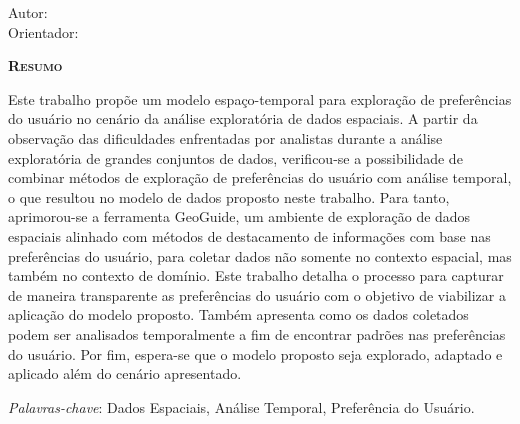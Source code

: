 \begin{center}
	{\Large{\textbf{\myThesis}}}
\end{center}

\vspace{1cm}

\begin{flushright}
	Autor: \myName\\
	Orientador: \mySupervisorName
\end{flushright}

\vspace{1cm}

\begin{center}
	\Large{\textsc{\textbf{Resumo}}}
\end{center}

\noindent Este trabalho propõe um modelo espaço-temporal para exploração de preferências do usuário no cenário da análise exploratória de dados espaciais. A partir da observação das dificuldades enfrentadas por analistas durante a análise exploratória de grandes conjuntos de dados, verificou-se a possibilidade de combinar métodos de exploração de preferências do usuário com análise temporal, o que resultou no modelo de dados proposto neste trabalho. Para tanto, aprimorou-se a ferramenta GeoGuide, um ambiente de exploração de dados espaciais alinhado com métodos de destacamento de informações com base nas preferências do usuário, para coletar dados não somente no contexto espacial, mas também no contexto de domínio. Este trabalho detalha o processo para capturar de maneira transparente as preferências do usuário com o objetivo de viabilizar a aplicação do modelo proposto. Também apresenta como os dados coletados podem ser analisados temporalmente a fim de encontrar padrões nas preferências do usuário. Por fim, espera-se que o modelo proposto seja explorado, adaptado e aplicado além do cenário apresentado.

\noindent\textit{Palavras-chave}: Dados Espaciais, Análise Temporal, Preferência do Usuário.